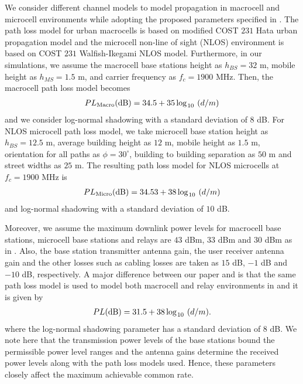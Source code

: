 \documentclass[conference,letterpaper,final,10pt]{IEEEtran}
\begin{document}
We consider different channel models to model propagation in macrocell and microcell environments while adopting the proposed parameters specified in \cite{UmtsCostHataWI}. The path loss model for urban macrocells is based on modified COST $231$ Hata urban propagation model and the microcell non-line of sight (NLOS) environment is based on COST $231$ Walfish-Ikegami NLOS model. Furthermore, in our simulations, we assume the macrocell base stations height as $h_{BS} = 32$ m, mobile height as $h_{MS} = 1.5$ m, and carrier frequency as $f_c = 1900$ MHz. Then, the macrocell path loss model becomes
\begin{align} PL_{\mathrm{Macro}}(\mathrm{dB}) = 34.5 + 35 \log_{\hspace{.01in}10}\hspace{.05in}(d/m)\end{align}
and we consider log-normal shadowing with a standard deviation of $8$ dB. For NLOS microcell path loss model, we take microcell base station height as $h_{BS} = 12.5$ m, average building height as $12$ m, mobile height as $1.5$ m, orientation for all paths as $\phi = 30^\circ$, building to building separation as $50$ m and street widths as $25$ m. The resulting path loss model for NLOS microcells at $f_c = 1900$ MHz is
\begin{align} PL_{\mathrm{Micro}}(\mathrm{dB}) = 34.53 + 38 \log_{\hspace{.01in}10}\hspace{.05in}(d/m) \end{align}
and log-normal shadowing with a standard deviation of $10$ dB.

Moreover, we assume the maximum downlink power levels for macrocell base stations, microcell base stations and relays are $43$ dBm, $33$ dBm and $30$ dBm as in \cite{ReleaseNine,RamanConf}. Also, the base station transmitter antenna gain, the user receiver antenna gain and the other losses such as cabling losses are taken as $15$ dB, $-1$ dB and $-10$ dB, respectively. A major difference between our paper and \cite{RamanConf} is that the same path loss model is used to model both macrocell and relay environments in \cite{RamanConf}  and it is given by
\begin{align} PL(\mathrm{dB}) = 31.5 + 38 \log_{\hspace{.01in}10}\hspace{.05in}(d/m). \label{ramanpathlossmodel}\end{align}
where the log-normal shadowing parameter has a standard deviation of $8$ dB. We note here that the transmission power levels of the base stations bound the permissible power level ranges and the antenna gains determine the received power levels along with the path loss models used. Hence, these parameters closely affect the maximum achievable common rate.
\end{document}
